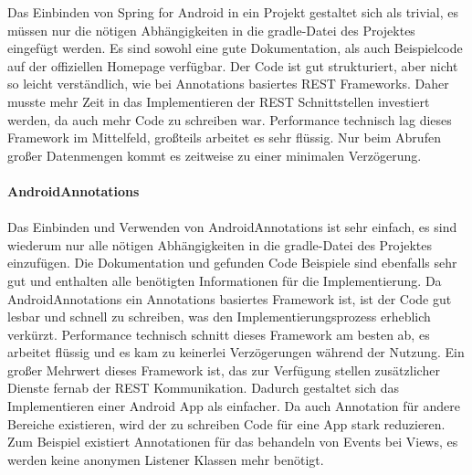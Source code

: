 Das Einbinden von Spring for Android in ein Projekt gestaltet sich als trivial, es müssen nur die nötigen Abhängigkeiten in die gradle-Datei des Projektes eingefügt werden. Es sind sowohl eine gute Dokumentation, als auch Beispielcode auf der offiziellen Homepage verfügbar. Der Code ist gut strukturiert, aber nicht so leicht verständlich, wie bei Annotations basiertes REST Frameworks. Daher musste mehr Zeit in das Implementieren der REST Schnittstellen investiert werden, da auch mehr Code zu schreiben war.  Performance technisch lag dieses Framework im Mittelfeld, großteils arbeitet es sehr flüssig. Nur beim Abrufen großer Datenmengen kommt es zeitweise zu einer minimalen Verzögerung.
\\\\
{\large \textbf{AndroidAnnotations}}\\\\
Das Einbinden und Verwenden von AndroidAnnotations ist sehr einfach, es sind wiederum nur alle nötigen Abhängigkeiten in die gradle-Datei des Projektes einzufügen. Die Dokumentation und gefunden Code Beispiele sind ebenfalls sehr gut und enthalten alle benötigten Informationen für die Implementierung. Da AndroidAnnotations ein Annotations basiertes Framework ist, ist der Code gut lesbar und schnell zu schreiben, was den Implementierungsprozess erheblich verkürzt. Performance technisch schnitt dieses Framework am besten ab, es arbeitet flüssig und es kam zu keinerlei Verzögerungen während der Nutzung. Ein großer Mehrwert dieses Framework ist, das zur Verfügung stellen zusätzlicher Dienste fernab der REST Kommunikation. Dadurch gestaltet sich das Implementieren einer Android App als einfacher. Da auch Annotation für andere Bereiche existieren, wird der zu schreiben Code für eine App stark reduzieren. Zum Beispiel existiert Annotationen für das behandeln von Events bei Views, es werden keine anonymen Listener Klassen mehr benötigt.